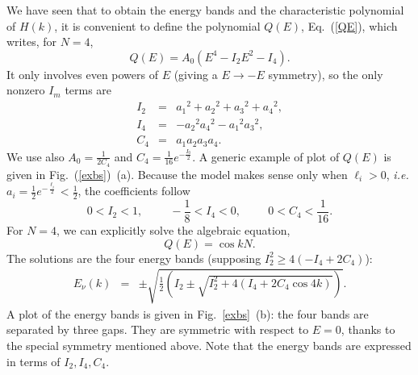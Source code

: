 \documentclass[]{revtex4-1}
\begin{document}
We have seen that to obtain the energy bands and the characteristic polynomial of $H(k)$, it is convenient to define the polynomial $Q(E)$, Eq.~(\ref{QE}), which writes, for $N=4$,
\begin{equation}
Q(E)=A_0 (E^4-I_2E^2-I_4).
\end{equation}
 It only involves even powers of $E$ (giving a $E \rightarrow -E$ symmetry), so the only nonzero $I_m$ terms are
\begin{eqnarray}
 I_2 &=& {a_1}^2+{a_2}^2+{a_3}^2+{a_4}^2,  \label{I2N40}\\
  I_4 &=&  -{a_2}^2{a_4}^2-{a_1}^2{a_3}^2, \label{I4N40}\\
   C_4 &=& a_1a_2a_3a_4. \label{C4N40}
\end{eqnarray}
We use also $A_0=\frac{1}{2C_4}$ and $C_4=\frac{1}{16} e^{-\frac{I_0}{2}}$. A generic example of plot of $Q(E)$ is given in Fig.~(\ref{exbs})~(a).  Because the model makes sense only when $\ell_i > 0$, \textit{i.e.} $a_i =\frac{1}{2} e^{-\frac{\ell_i}{2}} < \frac{1}{2}$, the coefficients follow
 \begin{equation} 0 < I_2 < 1, \hspace{1cm}  -\frac{1}{8} <I_4<0,  \hspace{1cm} 0 < C_4 < \frac{1}{16}. \label{constraintsN4} \end{equation}
For $N=4$, we can explicitly  solve the algebraic equation,
\begin{equation} Q(E)=\cos kN. \end{equation} The solutions are the four energy bands (supposing $I_2^2\geq 4(-I_4+2C_4)$):
\begin{eqnarray}
  E_{\nu}(k) &=& \pm \sqrt{\frac{1}{2} \left( I_2 \pm \sqrt{I_2^2+4(I_4+2C_4\cos 4k)} \right)}.
\label{bandsN4} \end{eqnarray}
 A plot of the energy bands is given in Fig.~\ref{exbs}~(b): the four bands are separated by three gaps.  They are symmetric with respect to $E=0$, thanks to the special symmetry mentioned above. Note that the energy bands are expressed in terms of $I_2, I_4, C_4$.
\end{document}
